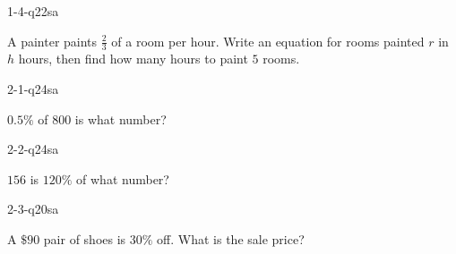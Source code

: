 \documentclass[12pt, fleqn, openany]{studyGuide}
\begin{document}
\renewcommand{\VMBookTitle}{3 Virginia SOL Grade 7 Math Practice Tests}
\renewcommand{\VMBookSubtitle}{Full-Length Test Prep with Detailed Answer Explanations}
\renewcommand{\VMFooterURL}{https://viewmath.com/grade7}
\renewcommand{\VMFooterURLDisplay}{ViewMath.com/Grade7}






\tableofcontents
\cleardoublepage
{}


\begin{practiceQuestion}{1-4-q22}{sa}
\begin{questionText}
A painter paints $\frac{2}{3}$ of a room per hour. Write an equation for rooms painted $r$ in $h$ hours, then find how many hours to paint $5$ rooms.
\end{questionText}
\end{practiceQuestion}

\begin{practiceQuestion}{2-1-q24}{sa}
\begin{questionText}
$0.5\%$ of $800$ is what number?
\end{questionText}
\end{practiceQuestion}

\begin{practiceQuestion}{2-2-q24}{sa}
\begin{questionText}
$156$ is $120\%$ of what number?
\end{questionText}
\end{practiceQuestion}

\begin{practiceQuestion}{2-3-q20}{sa}
\begin{questionText}
A $\$90$ pair of shoes is $30\%$ off. What is the sale price?
\end{questionText}
\end{practiceQuestion}
\end{document}
